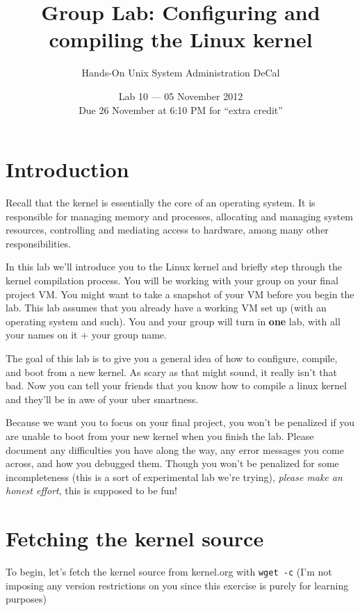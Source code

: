\documentclass{article}
\begin{document}
\title{Group Lab: Configuring and compiling the Linux kernel}
\author{Hands-On {\sc Unix} System Administration DeCal}
\date{Lab 10 --- 05 November 2012 \\ {\small Due 26 November at 6:10 PM for ``extra credit''}} 
\maketitle

\section{Introduction}


Recall that the kernel is essentially the core of an operating system. It is responsible for managing memory and processes, allocating and managing system resources, controlling and mediating access to hardware, among many other responsibilities.

In this lab we'll introduce you to the Linux kernel and briefly step through the kernel compilation process. You will be working with your group on your final project VM. You might want to take a snapshot of your VM before you begin the lab. This lab assumes that you already have a working VM set up (with an operating system and such). You and your group will turn in {\bf one} lab, with all your names on it + your group name.

The goal of this lab is to give you a general idea of how to configure, compile, and boot from a new kernel. As scary as that might sound, it really isn't that bad. Now you can tell your friends that you know how to compile a linux kernel and they'll be in awe of your uber smartness. 

Because we want you to focus on your final project, you won't be penalized if you are unable to boot from your new kernel when you finish the lab. Please document any difficulties you have along the way, any error messages you come across, and how you debugged them. 
Though you won't be penalized for some incompleteness (this is a sort of experimental lab we're trying), {\it please make an honest effort}, this is supposed to be fun! 


\section{Fetching the kernel source}
To begin, let's fetch the kernel source from kernel.org with \texttt{wget -c} (I'm not imposing any version restrictions on you since this exercise is purely for learning purposes)
\end{document}
